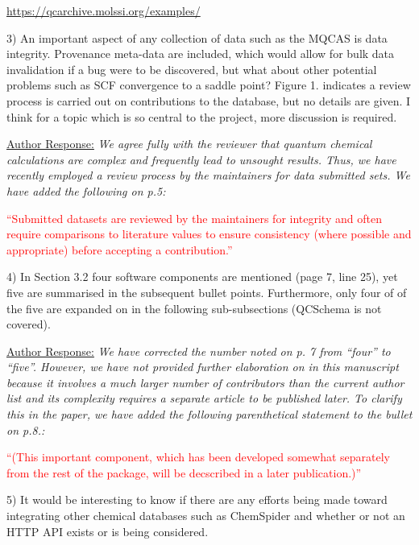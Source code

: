 \documentclass[12pt]{article}
\newcommand{\qcaN}{QCArchive}
\newcommand{\qcskN}{QCSchema}
\newcommand{\qca}{{\sc{\qcaN}}\xspace}%
\newcommand{\qcsk}{{\sc{\qcskN}}\xspace}%
\newcommand{\mqcas}{{\sc{mqcas}}\xspace}%
\begin{document}
\begin{center}
\url{https://qcarchive.molssi.org/examples/}
\end{center}

3) An important aspect of any collection of data such as the MQCAS is data
integrity.  Provenance meta-data are included, which would allow for bulk data
invalidation if a bug were to be discovered, but what about other potential
problems such as SCF convergence to a saddle point?  Figure 1.  indicates a
review process is carried out on contributions to the database, but no details
are given.  I think for a topic which is so central to the project, more
discussion is required.

\noindent
\underline{Author Response:} \textit{We agree fully with the reviewer that quantum
chemical calculations are complex and frequently lead to unsought results.
Thus, we have recently employed a review process by the \mqcas maintainers for
data submitted sets.  We have added the following on p.5:}

\noindent \textcolor{red}{``Submitted datasets are reviewed by the \mqcas
maintainers for integrity and often require comparisons to literature values
to ensure consistency (where possible and appropriate) before accepting a
contribution.''}

4) In Section 3.2 four software components are mentioned (page 7, line 25), yet 
five are summarised in the subsequent bullet points.  Furthermore, only four of
of the five are expanded on in the following sub-subsections (QCSchema is not 
covered).

\noindent \underline{Author Response:} \textit{We have corrected the number noted on
p. 7 from ``four'' to ``five''.  However, we have not provided further
elaboration on \qcsk in this manuscript because it involves a much larger
number of contributors than the current author list and its complexity requires
a separate article to be published later.  To clarify this in the paper, we have
added the following parenthetical statement to the \qcsk bullet on p.8.:}

\noindent \textcolor{red}{``(This important component, which has been
developed somewhat separately from the rest of the \qca package, will be
decscribed in a later publication.)''}

5) It would be interesting to know if there are any efforts being made toward
integrating other chemical databases such as ChemSpider and whether or not 
an HTTP API exists or is being considered.
\end{document}
